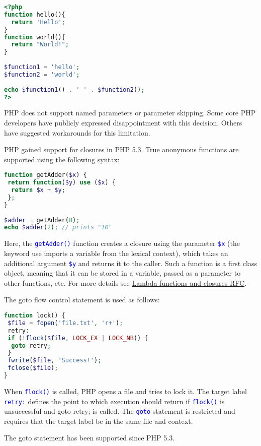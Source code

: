 \begin{lstlisting}[language=PHP]
<?php
function hello(){
  return 'Hello';
}
function world(){
  return "World!";
}
 
$function1 = 'hello';
$function2 = 'world';
 
echo $function1() . ' ' . $function2();
?>
\end{lstlisting}

PHP does not support named parameters or parameter skipping. Some core PHP developers have publicly expressed disappointment with this decision. Others have suggested workarounds for this limitation.

PHP gained support for closures in PHP 5.3. True anonymous functions are supported using the following syntax:


\begin{lstlisting}[language=PHP]
function getAdder($x) {
 return function($y) use ($x) {
  return $x + $y;
 };
}
 
$adder = getAdder(8);
echo $adder(2); // prints "10"
\end{lstlisting}


Here, the  \textcolor{Blue}{\texttt{getAdder()}} function creates a closure using the parameter  \textcolor{Blue}{\texttt{\$x}} (the keyword use imports a variable from the lexical context), which takes an additional argument  \textcolor{Blue}{\texttt{\$y}} and returns it to the caller. Such a function is a first class object, meaning that it can be stored in a variable, passed as a parameter to other functions, etc. For more details see \href{http://wiki.php.net/rfc/closures}{Lambda functions and closures RFC}.


The goto flow control statement is used as follows:

\begin{lstlisting}[language=PHP]
function lock() {
 $file = fopen('file.txt', 'r+');
 retry:
 if (!flock($file, LOCK_EX | LOCK_NB)) {
  goto retry;
 }
 fwrite($file, 'Success!');
 fclose($file);
}
\end{lstlisting}


When \textcolor{Blue}{\texttt{flock()}} is called, PHP opens a file and tries to lock it. The target label \textcolor{Blue}{\texttt{retry:}} defines the point to which execution should return if \textcolor{Blue}{\texttt{flock()}} is unsuccessful and goto retry; is called. The \textcolor{Blue}{\texttt{goto}} statement is restricted and requires that the target label be in the same file and context.

The goto statement has been supported since PHP 5.3.




